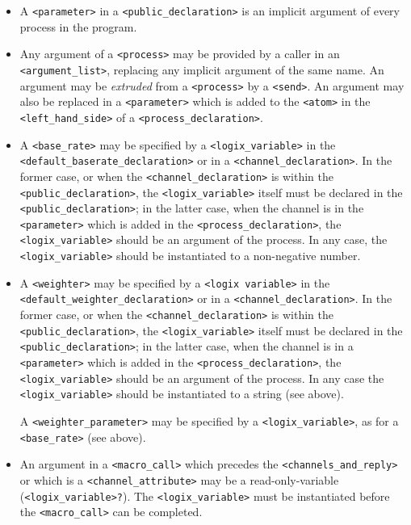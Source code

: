 \begin{itemize}
\item
A \verb+<parameter>+ in a \verb+<public_declaration>+ is an implicit
argument of every process in the program.

\item
Any argument of a \verb+<process>+ may be  provided by a caller in an
\verb+<argument_list>+, replacing any implicit argument of the same
name. 
An argument  may be {\em extruded} from a \verb+<process>+ by a
\verb+<send>+.  An argument
may also be replaced in a \verb+<parameter>+ which is added to the
\verb+<atom>+ in the \verb+<left_hand_side>+ of a
\verb+<process_declaration>+.

\item
A \verb+<base_rate>+ may be specified by a \verb+<logix_variable>+
in the \linebreak
\verb+<default_baserate_declaration>+ or in a
\verb+<channel_declaration>+.  In the former case, or when the
\verb+<channel_declaration>+ is within the \verb+<public_declaration>+,
the \verb+<logix_variable>+ itself must be declared in the
\verb+<public_declaration>+; in the latter case, when the channel
is in the \verb+<parameter>+ which is added in the \linebreak
\verb+<process_declaration>+, the \verb+<logix_variable>+ should
be an argument of the process.  In any case, the \verb+<logix_variable>+
should be instantiated to a non-negative number.

\item
A \verb+<weighter>+ may be specified by a \verb+<logix variable>+
in the \linebreak \verb+<default_weighter_declaration>+ or in a
\verb+<channel_declaration>+.  In the former case, or when the
\verb+<channel_declaration>+ is within the \verb+<public_declaration>+, 
the \verb+<logix_variable>+ itself must be declared in the
\verb+<public_declaration>+; in the latter case, when the channel is in
a \verb+<parameter>+ which is added in the 
\linebreak \verb+<process_declaration>+, 
the \verb+<logix_variable>+ should be an argument of the process.
In any case the \verb+<logix_variable>+ should be instantiated to
a string (see above).

\noindent
A \verb+<weighter_parameter>+ may be specified by a
\verb+<logix_variable>+, as for a \verb+<base_rate>+ (see above).

\item
An argument in a \verb+<macro_call>+ which precedes the \linebreak
\verb+<channels_and_reply>+ or which is a \verb+<channel_attribute>+
may be a read-only-variable
(\verb+<logix_variable>?+).
The \verb+<logix_variable>+ must be instantiated before the
\verb+<macro_call>+ can be completed.


\end{itemize}
